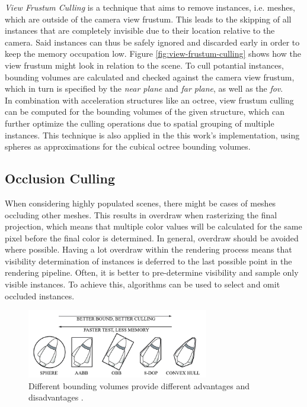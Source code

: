 \noindent
\emph{View Frustum Culling} is a technique that aims to remove instances, i.e. meshes, which are outside of the camera 
view frustum. This leads to the skipping of all instances that are completely invisible due to their location relative to 
the camera. Said instances can thus be safely ignored and discarded early in order to keep the memory occupation low. 
Figure \ref{fig:view-frustum-culling} shows how the view frustum might look in relation to the scene. 
To cull potantial instances, bounding volumes are calculated and checked against the camera view frustum, which in turn 
is specified by the \emph{near plane} and \emph{far plane}, as well as the \emph{fov}. \\

\noindent
In combination with acceleration structures like an octree, view frustum culling can be computed for the bounding 
volumes of the given structure, which can further optimize the culling operations due to spatial grouping of multiple 
instances. This technique is also applied in the this work's implementation, using spheres as approximations for the 
cubical octree bounding volumes.


\subsection*{Occlusion Culling} \label{subsec-point-based-occlusion-culling}

When considering highly populated scenes, there might be cases of meshes occluding other meshes. This results 
in overdraw when rasterizing the final projection, which means that multiple color values will be calculated 
for the same pixel before the final color is determined. In general, overdraw should be avoided where possible. 
Having a lot overdraw within the rendering process means that visibility determination of instances is deferred 
to the last possible point in the rendering pipeline. Often, it is better to pre-determine visibility and sample 
only visible instances. To achieve this, algorithms can be used to select and omit occluded instances. \\

\begin{figure}[h]
    \centering
    \includegraphics[width=300px]{images/graphics/bounding-volume-quality.jpg}
    \caption{Different bounding volumes provide different advantages and disadvantages \cite{Six2021}.}
    \label{fig:bounding-volumes}
\end{figure}

